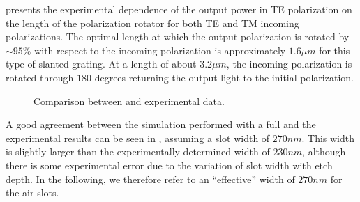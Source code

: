  presents the experimental dependence of the
output power in TE polarization on the length of the polarization
rotator for both TE and TM incoming polarizations. The optimal length
at which the output polarization is rotated by $\sim 95\%$ with
respect to the incoming polarization is approximately $1.6 \mu m$ for
this type of slanted grating. At a length of about $3.2 \mu m$, the
incoming polarization is rotated through $180$ degrees returning the
output light to the initial polarization.

\begin{figure}[htbp]
  \begin{center}
  \end{center}
  \caption{Comparison between \threeDFDTD and experimental data.}
  \label{fig:polrot_figg}
\end{figure}

A good agreement between the simulation performed with a full
\threeDFDTD and the experimental results can be seen in
, assuming a slot width of $270 nm$. This
width is slightly larger than the experimentally determined width of
$230 nm$, although there is some experimental error due to the
variation of slot width with etch depth. In the following, we
therefore refer to an ``effective'' width of $270 nm$ for the air
slots.

